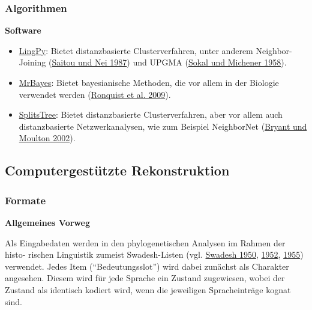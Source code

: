 \subsubsection{\texorpdfstring{{Algorithmen}}{Algorithmen}}

\textbf{Software}

\begin{itemize}
\itemsep1pt\parskip0pt
\item
  \href{http://lingpy.org}{LingPy}: Bietet distanzbasierte
  Clusterverfahren, unter anderem Neighbor-Joining
  (\href{http://bibliography.lingpy.org?key=Saitou1987}{Saitou und Nei
  1987}) und UPGMA
  (\href{http://bibliography.lingpy.org?key=Sokal1958}{Sokal und
  Michener 1958}).
\item
  \href{http://mrbayes.sourceforge.net}{MrBayes}: Bietet bayesianische
  Methoden, die vor allem in der Biologie verwendet werden
  (\href{http://bibliography.lingpy.org?key=Ronquist2009}{Ronquist et
  al. 2009}).
\item
  \href{http://splitstree.org}{SplitsTree}: Bietet distanzbasierte
  Clusterverfahren, aber vor allem auch distanzbasierte
  Netzwerkanalysen, wie zum Beispiel NeighborNet
  (\href{http://bibliography.lingpy.org?key=Bryant2002}{Bryant und
  Moulton 2002}).
\end{itemize}

\subsection{\texorpdfstring{{Computergestützte
Rekonstruktion}}{Computergestützte Rekonstruktion}}

\subsubsection{\texorpdfstring{{Formate}}{Formate}}

\textbf{Allgemeines Vorweg}

Als Eingabedaten werden in den phylogenetischen Analysen im Rahmen der
histo- rischen Linguistik zumeist Swadesh-Listen (vgl.
\href{http://bibliography.lingpy.org?key=Swadesh1950}{Swadesh 1950},
\href{http://bibliography.lingpy.org?key=Swadesh1952}{1952},
\href{http://bibliography.lingpy.org?key=Swadesh1955}{1955}) verwendet.
Jedes Item (``Bedeutungsslot'') wird dabei zunächst als Charakter
angesehen. Diesem wird für jede Sprache ein Zustand zugewiesen, wobei
der Zustand als identisch kodiert wird, wenn die jeweiligen
Spracheinträge kognat sind.

